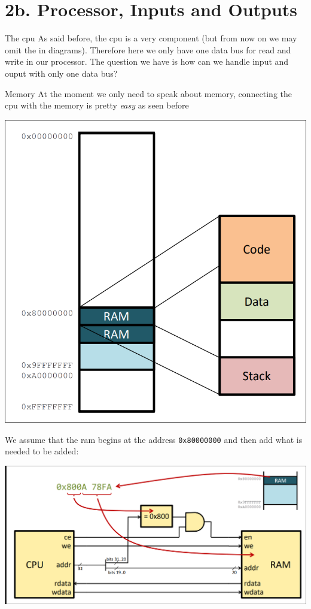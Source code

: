 \section{2b. Processor, Inputs and Outputs}

\begin{parag}{The cpu}
    As said before, the cpu is a very  component (but from now on we may omit the  in diagrams). Therefore here we only have one data bus for read and write in our processor. The question we have is how can we handle input and ouput with only one data bus?
\end{parag}
\begin{parag}{Memory}
    At the moment we only need to speak about memory, connecting the cpu with the memory is pretty \textit{easy} as seen before
	\begin{center}
	\includegraphics[scale=0.3]{screenshots/2025-10-22_3.png}
	\end{center}
	We assume that the ram begins at the  address \texttt{0x80000000} and then add what is needed to be added:
	\begin{center}
	\includegraphics[scale=0.2]{screenshots/2025-10-22_4.png}
	\end{center}
\end{parag}

